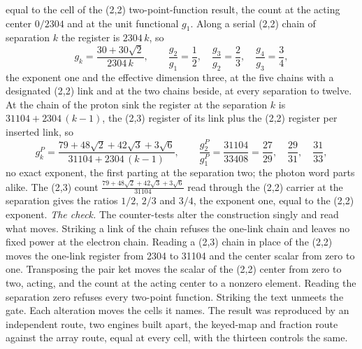 \begin{chproof}
equal to the cell of the (2,2) two-point-function result, the count at the acting center $0/2304$ and at the unit functional $g_{1}$. Along a serial (2,2) chain of separation $k$ the register is $2304\,k$, so
\begin{equation} g_{k} = \frac{30 + 30\sqrt{2}}{2304\,k}, \qquad \frac{g_{2}}{g_{1}} = \frac{1}{2}, \quad \frac{g_{3}}{g_{2}} = \frac{2}{3}, \quad \frac{g_{4}}{g_{3}} = \frac{3}{4}, \end{equation}
the exponent one and the effective dimension three, at the five chains with a designated (2,2) link and at the two chains beside, at every separation to twelve. At the chain of the proton sink the register at the separation $k$ is $31104 + 2304\,(k-1)$, the (2,3) register of its link plus the (2,2) register per inserted link, so
\begin{equation} g_{k}^{P} = \frac{79 + 48\sqrt{2} + 42\sqrt{3} + 3\sqrt{6}}{31104 + 2304\,(k-1)}, \qquad \frac{g_{2}^{P}}{g_{1}^{P}} = \frac{31104}{33408} = \frac{27}{29}, \quad \frac{29}{31}, \quad \frac{31}{33}, \end{equation}
no exact exponent, the first parting at the separation two; the photon word parts alike. The (2,3) count $\tfrac{79 + 48\sqrt{2} + 42\sqrt{3} + 3\sqrt{6}}{31104}$ read through the (2,2) carrier at the separation gives the ratios $1/2$, $2/3$ and $3/4$, the exponent one, equal to the (2,2) exponent.
\textit{The check.} The counter-tests alter the construction singly and read what moves. Striking a link of the chain refuses the one-link chain and leaves no fixed power at the electron chain. Reading a (2,3) chain in place of the (2,2) moves the one-link register from 2304 to 31104 and the center scalar from zero to one. Transposing the pair ket moves the scalar of the (2,2) center from zero to two, acting, and the count at the acting center to a nonzero element. Reading the separation zero refuses every two-point function. Striking the text unmeets the gate. Each alteration moves the cells it names. The result was reproduced by an independent route, two engines built apart, the keyed-map and fraction route against the array route, equal at every cell, with the thirteen controls the same.
\begin{figure}[h]\centering{}
\end{figure}
\end{chproof}
